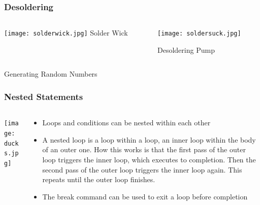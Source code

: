\documentclass{beamer}
\begin{document}
\begin{frame}\frametitle{Desoldering}
\begin{columns}
\begin{column}{5cm}
\begin{center}
\texttt{[image: solderwick.jpg]}
Solder Wick
\end{center}
\end{column}
\begin{column}{5cm}
\begin{center}
\texttt{[image: soldersuck.jpg]}

\vspace{1cm}
Desoldering Pump
\end{center}
\end{column}
\end{columns}
\end{frame}

\begin{frame}{Generating Random Numbers}
\lstran
\end{frame}

\begin{frame}\frametitle{Nested Statements}
\begin{columns}
\begin{column}{4cm}
\begin{center}
\texttt{[image: ducks.jpg]}
\end{center}
\end{column}
\begin{column}{6.5cm}
\begin{itemize}
\item Loops and conditions can be nested within each other
\item A nested loop is a loop within a loop, an inner loop within the body of an outer one. How this works is that the first pass of the outer loop triggers the inner loop, which executes to completion. Then the second pass of the outer loop triggers the inner loop again. This repeats until the outer loop finishes.
\item The break command can be used to exit a loop before completion
\end{itemize}
\end{column}
\end{columns}
\end{frame}
\end{document}
